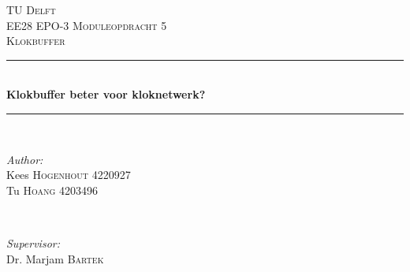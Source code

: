 \documentclass[12pt]{article}
\begin{document}
\begin{titlepage}

\newcommand{\HRule}{\rule{\linewidth}{0.5mm}} %

\center %
 

\textsc{\LARGE TU Delft}\\[1.5cm] %
\textsc{\Large EE28 EPO-3 Moduleopdracht 5}\\[0.5cm] %
\textsc{\large Klokbuffer}\\[0.5cm] %


\HRule \\[0.4cm]
{ \huge \bfseries Klokbuffer  beter voor kloknetwerk?}\\[0.4cm] %
\HRule \\[1.5cm]
 

\begin{minipage}{0.4\textwidth}
\begin{flushleft} \large
\emph{Author:}\\
Kees \textsc{Hogenhout} 4220927\\ %
Tu \textsc{Hoang} 4203496 %
\end{flushleft}
\end{minipage}
~
\begin{minipage}{0.4\textwidth}
\begin{flushright} \large
\emph{Supervisor:} \\
Dr. Marjam \textsc{Bartek} %
\end{flushright}
\end{minipage}\\[4cm]


\end{titlepage}
\end{document}
